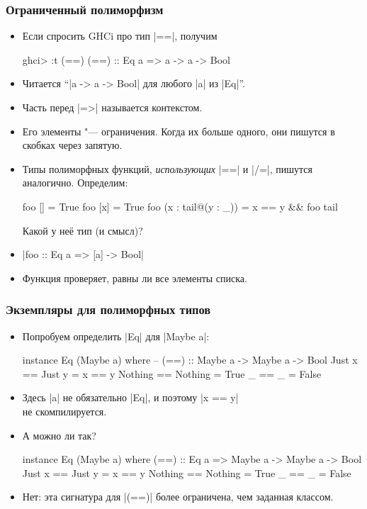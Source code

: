 \documentclass[10pt]{beamer}
\begin{document}
\begin{frame}[fragile]
  \frametitle{Ограниченный полиморфизм}
  \begin{itemize}
    \item Если спросить GHCi про тип \haskinline|==|, получим
          \begin{haskell}
            ghci> :t (==)
            (==) :: Eq a => a -> a -> Bool
          \end{haskell}
    \item Читается \enquote{\haskinline|a -> a -> Bool| для любого \haskinline|a| из \haskinline|Eq|}.
    \item Часть перед \haskinline|=>| называется контекстом.
    \item Его элементы "--- ограничения. Когда их больше одного, они пишутся в скобках через запятую.\pause
    \item Типы полиморфных функций, \emph{использующих} \haskinline|==| и \haskinline|/=|, пишутся аналогично. Определим:
          \begin{haskell}
            foo [] = True
            foo [x] = True
            foo (x : tail@(y : _)) = x == y && foo tail
          \end{haskell}
          Какой у неё тип (и смысл)? \pause
    \item \haskinline|foo :: Eq a => [a] -> Bool| \pause
    \item Функция проверяет, равны ли все элементы списка.
  \end{itemize}
\end{frame}

\begin{frame}[fragile]
  \frametitle{Экземпляры для полиморфных типов}
  \begin{itemize}
    \item Попробуем определить \haskinline|Eq| для \haskinline|Maybe a|:\pause
          \begin{haskell}
            instance Eq (Maybe a) where
                -- (==) :: Maybe a -> Maybe a -> Bool
                Just x == Just y = x == y
                Nothing == Nothing = True
                _ == _ = False
          \end{haskell}
           \pause
    \item Здесь \haskinline|a| не обязательно \haskinline|Eq|, и поэтому \haskinline|x == y| \\не скомпилируется.
    \item А можно ли так?
          \begin{haskell}
            instance Eq (Maybe a) where
                (==) :: Eq a => Maybe a -> Maybe a -> Bool
                Just x == Just y = x == y
                Nothing == Nothing = True
                _ == _ = False
          \end{haskell}
          \pause
    \item Нет: эта сигнатура для \haskinline|(==)| более ограничена, чем заданная классом.
  \end{itemize}
\end{frame}
\end{document}
